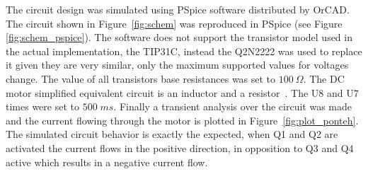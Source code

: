     The circuit design was simulated using PSpice software distributed by OrCAD. The circuit shown in Figure~\ref{fig:schem} was reproduced in PSpice (see Figure \ref{fig:schem_pspice}). The software does not support the transistor model used in the actual implementation, the TIP31C, instead the Q2N2222 was used to replace it given they are very similar, only the maximum supported values for voltages change. The value of all transistors base resistances was set to $100\:\Omega$. The DC motor simplified equivalent circuit is an inductor and a resistor~\cite{CHAPMAN}. The U8 and U7 times were set to $500\; ms$.
	Finally a transient analysis over the circuit was made and the current flowing through the motor is plotted in Figure~\ref{fig:plot_ponteh}. The simulated circuit behavior is exactly the expected, when Q1 and Q2 are activated the current flows in the positive direction, in opposition to Q3 and Q4 active which results in a negative current flow.
	

